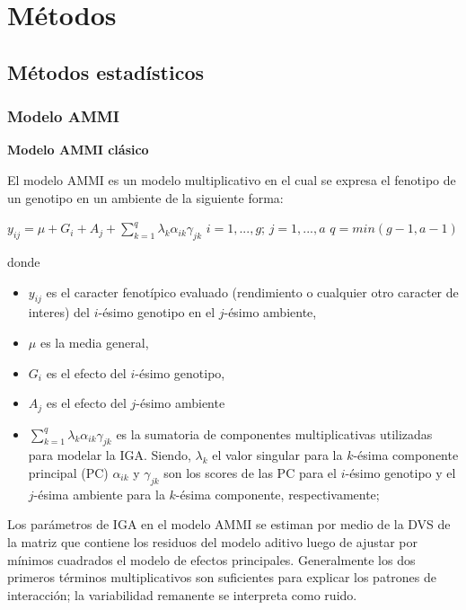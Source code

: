 
\chapter{Métodos}
\section{Métodos estadísticos}

\subsection{Modelo AMMI}

\textbf{Modelo AMMI clásico}

El modelo AMMI es un modelo multiplicativo en el cual se expresa el fenotipo de un genotipo en un ambiente de la siguiente forma:
\begin{center}
$y_{ij}= \mu +G_i + A_j + \sum_{k=1}^q \lambda_k \alpha_{ik} \gamma_{jk}$ \vspace{1cm} $ i=1,...,g$; $ j=1,...,a$ $q=min(g-1,a-1)$
\end{center} 
donde 
\begin{itemize}
\item $y_{ij}$ es el caracter fenotípico evaluado (rendimiento o cualquier otro caracter de interes) del $i$-ésimo genotipo en el $j$-ésimo ambiente,
\item $\mu$ es la media general,
\item  $G_i$ es el efecto del $i$-ésimo genotipo,
\item $A_j$ es el efecto del $j$-ésimo ambiente
\item $\sum_{k=1}^q \lambda_k \alpha_{ik} \gamma_{jk}$ es la sumatoria de componentes multiplicativas utilizadas para modelar la IGA. Siendo, $\lambda_k$ el valor singular para la  $k$-ésima componente principal (PC) $\alpha_{ik}$ y $\gamma_{jk}$ son los scores de las PC para el $i$-ésimo genotipo y el $j$-ésima ambiente para la $k$-ésima componente, respectivamente;
\end{itemize}

Los parámetros de IGA en el modelo AMMI se estiman por medio de la DVS de la matriz que contiene los residuos del modelo aditivo luego de ajustar por mínimos cuadrados el modelo de efectos principales. Generalmente los dos primeros términos multiplicativos son suficientes para explicar los patrones de interacción; la variabilidad remanente se interpreta como ruido. 

